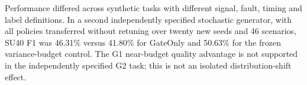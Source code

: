 Performance differed across synthetic tasks with different signal, fault, timing and label definitions. In a second independently specified stochastic generator, with all policies transferred without retuning over twenty new seeds and 46 scenarios, SU40 F1 was 46.31\% versus 41.80\% for GateOnly and 50.63\% for the frozen variance-budget control. The G1 near-budget quality advantage is not supported in the independently specified G2 task; this is not an isolated distribution-shift effect.
